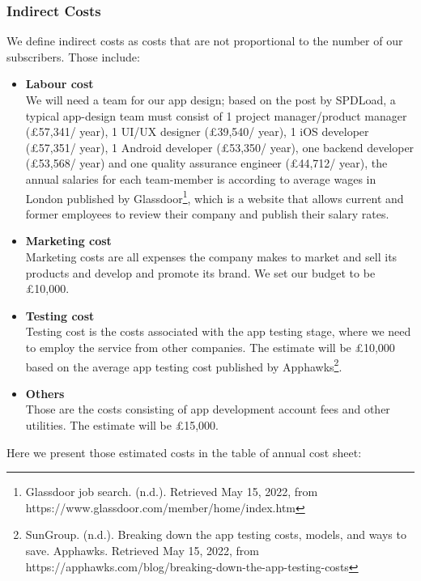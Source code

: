 \subsubsection{Indirect Costs}
We define indirect costs as costs that are not proportional to the number of our subscribers. Those include:
\begin{itemize}
\item \textbf{Labour cost}
\\We will need a team for our app design; based on the post by SPDLoad, a typical app-design team must consist of 1 project manager/product manager (£57,341/ year), 1 UI/UX designer (£39,540/ year), 1 iOS developer (£57,351/ year), 1 Android developer (£53,350/ year), one backend developer (£53,568/ year) and one quality assurance engineer (£44,712/ year), the annual salaries for each team-member is according to average wages in London published by Glassdoor\footnote{Glassdoor job search. (n.d.). Retrieved May 15, 2022, from https://www.glassdoor.com/member/home/index.htm }, which is a website that allows current and former employees to review their company and publish their salary rates.
\item \textbf{Marketing cost}
\\ Marketing costs are all expenses the company makes to market and sell its products and develop and promote its brand. We set our budget to be £10,000.
\item \textbf{Testing cost}
\\ Testing cost is the costs associated with the app testing stage, where we need to employ the service from other companies. The estimate will be £10,000 based on the average app testing cost published by Apphawks\footnote{SunGroup. (n.d.). Breaking down the app testing costs, models, and ways to save. Apphawks. Retrieved May 15, 2022, from https://apphawks.com/blog/breaking-down-the-app-testing-costs }.
\item \textbf{Others}
\\Those are the costs consisting of app development account fees and other utilities. The estimate will be £15,000.
\end{itemize}

Here we present those estimated costs in the table of annual cost sheet:

